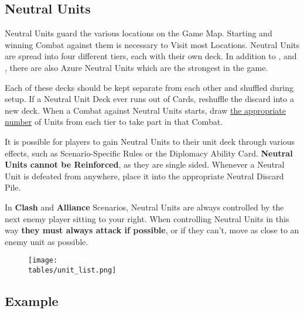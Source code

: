 \begin{multicols}{2}
\subsection*{Neutral Units}
Neutral Units guard the various locations on the Game Map.
Starting and winning Combat against them is necessary to Visit most Locations.
Neutral Units are spread into four different tiers, each with their own deck.
In addition to ,  and , there are also Azure  Neutral Units which are the strongest in the game.\par
Each of these decks should be kept separate from each other and shuffled during setup.
If a Neutral Unit Deck ever runs out of Cards, reshuffle the discard into a new deck.
When a Combat against Neutral Units starts, draw \hyperlink{Difficulty}{the appropriate number} of Units from each tier to take part in that Combat.\par
It is possible for players to gain Neutral Units to their unit deck through various effects, such as Scenario-Specific Rules or the Diplomacy Ability Card.
\textbf{Neutral Units cannot be Reinforced}, as they are single sided.
Whenever a Neutral Unit is defeated from anywhere, place it into the appropriate Neutral Discard Pile.\par
In \textbf{Clash} and \textbf{Alliance} Scenarios, Neutral Units are always controlled by the next enemy player sitting to your right.
When controlling Neutral Units in this way \textbf{they must always attack if possible}, or if they can't, move as close to an enemy unit as possible.\par

\end{multicols}

\begin{figure*}[!hb]
  \centering
  \texttt{[image: \\tables/unit\_list.png]}
\end{figure*}

\clearpage

\subsection*{Example}


